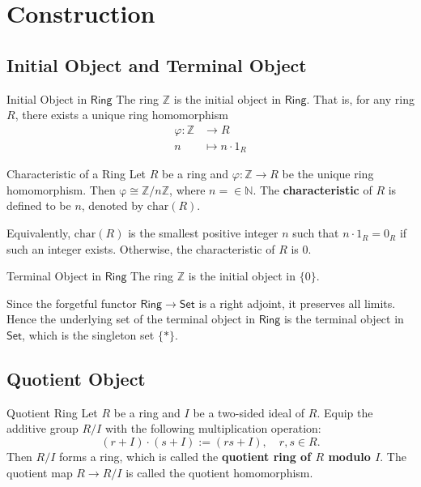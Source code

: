 \section{Construction}
\subsection{Initial Object and Terminal Object}
\begin{proposition}{Initial Object in $\mathsf{Ring}$}{}
    The ring $\mathbb{Z}$ is the initial object in $\mathsf{Ring}$. That is, for any ring $R$, there exists a unique ring homomorphism
    \begin{align*}
        \varphi:\mathbb{Z}&\longrightarrow R\\
        n&\longmapsto n\cdot 1_R
    \end{align*}
\end{proposition}

\begin{definition}{Characteristic of a Ring}{}
    Let $R$ be a ring and $\varphi:\mathbb{Z}\to R$ be the unique ring homomorphism. Then $\mathrm{\varphi}\cong \mathbb{Z}/n\mathbb{Z}$, where $n=\in\mathbb{N}$.
    The \textbf{characteristic} of $R$ is defined to be $n$, denoted by $\mathrm{char}(R)$.

    Equivalently, $\mathrm{char}(R)$ is the smallest positive integer $n$ such that $n\cdot 1_R=0_R$ if such an integer exists. Otherwise, the characteristic of $R$ is $0$.
\end{definition}

\begin{proposition}{Terminal Object in $\mathsf{Ring}$}{}
    The ring $\mathbb{Z}$ is the initial object in $\{0\}$.
\end{proposition}

Since the forgetful functor $\mathsf{Ring}\to\mathsf{Set}$ is a right adjoint, it preserves all limits. Hence the underlying set of the terminal object in $\mathsf{Ring}$ is the terminal object in $\mathsf{Set}$, which is the singleton set $\{*\}$.



\subsection{Quotient Object}
\begin{definition}{Quotient Ring}{}
    Let $R$ be a ring and $I$ be a two-sided ideal of $R$. Equip the additive group \( R / I \) with the following multiplication operation:
\[
(r+I) \cdot (s+I) := (rs + I), \quad r, s \in R .
\]
Then \( R / I \) forms a ring, which is called the \textbf{quotient ring of \( R \) modulo \( I \)}. The quotient map \( R \rightarrow R / I \) is called the quotient homomorphism.
\end{definition}

